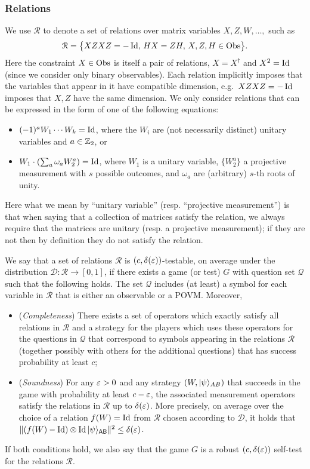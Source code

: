 \subsubsection{Relations}

We use $\mathcal{R}$ to denote a set of relations over matrix variables $X,Z,W,\ldots,$ such as
$$\mathcal{R}=\big\{XZXZ=-\mathop{\rm Id}\nolimits,\, HX=ZH,\,X,Z,H\in\mathrm{Obs}\big\}.$$
Here the constraint $X\in\mathrm{Obs}$ is itself a pair of relations, $X=X^\dagger$ and $X^2=\mathop{\rm Id}\nolimits$ (since we consider only binary observables). Each relation implicitly imposes that the variables that appear in it have compatible dimension, e.g.\ $XZXZ=-\mathop{\rm Id}\nolimits$ imposes that $X,Z$ have the same dimension. 
We only consider relations that can be expressed in the form of  one of the following
equations:
\begin{itemize}
  \item  $(-1)^a W_1\cdots W_k = \mathop{\rm Id}\nolimits$, where the $W_i$ are (not necessarily distinct) unitary variables and $a\in\mathbb{Z}_2$, or
  \item $ W_1 \cdot ( \sum_a \omega_a W_2^a)=\mathop{\rm Id}\nolimits$, where $W_1$ is a unitary variable, $\{W_2^a\}$ a projective measurement with $s$ possible outcomes, and $\omega_a$ are (arbitrary) $s$-th roots of unity.
\end{itemize}
Here what we mean by ``unitary variable'' (resp. ``projective measurement'') is that when saying that a collection of matrices satisfy the relation, we always require that the matrices are unitary (resp. a projective measurement); if they are not then by definition they do not satisfy the relation. 

\begin{definition}
We say that a set of relations $\mathcal{R}$ is $(c,\delta(\varepsilon))$-testable, on average under the distribution $\mathcal{D}:\mathcal{R}\to[0,1]$, if
  there exists a game (or test) $G$ with question set $\mathcal{Q}$ such that the following holds. The set $\mathcal{Q}$ includes (at least) a symbol for each variable in $\mathcal{R}$ that is either
  an observable or a POVM. Moreover,
\begin{itemize}
\item (\emph{Completeness}) There exists a set of operators which exactly satisfy all relations in $\mathcal{R}$ and a strategy for the players which uses these operators for the questions in $\mathcal{Q}$ that correspond to symbols appearing in the relations $\mathcal{R}$ (together possibly with others for the additional questions) that has success probability at least $c$;
\item (\emph{Soundness}) For any $\varepsilon>0$ and any strategy $(W,|\psi\rangle_{AB})$ that succeeds in the game with probability at least $c-\varepsilon$, the associated measurement operators satisfy the relations in $\mathcal{R}$ up to $\delta(\varepsilon)$. More precisely, on average
 over the choice of a relation $f(W)=\mathop{\rm Id}\nolimits$ from $\mathcal{R}$ chosen according to $\mathcal{D}$, it holds that $\|  (f(W)-\mathop{\rm Id}\nolimits)\otimes\mathop{\rm Id}\nolimits |\psi\rangle_{{\textsf{AB}}}\|^2 \leq \delta(\varepsilon)$.
\end{itemize}
If both conditions hold, we also say that the game $G$ is a robust $(c,\delta(\varepsilon))$ self-test for the relations $\mathcal{R}$. 
\end{definition}

